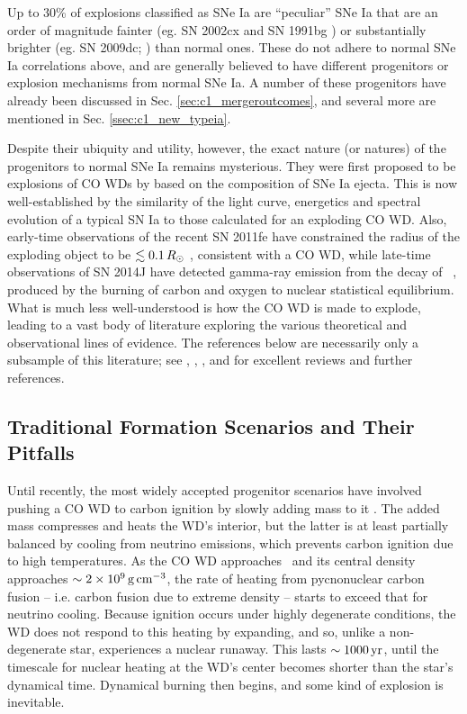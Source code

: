 Up to $30$\% \citep{li+11} of explosions classified as SNe Ia are ``peculiar'' SNe Ia that are an order of magnitude fainter (eg. SN 2002cx \citep{li+02, fole+13} and SN 1991bg \citep{mazz+97}) or substantially brighter (eg. SN 2009dc; \citealt{yama+09, taub+09}) than normal ones.  These do not adhere to normal SNe Ia correlations above, and are generally believed to have different progenitors or explosion mechanisms from normal SNe Ia.  A number of these progenitors have already been discussed in Sec. \ref{sec:c1_mergeroutcomes}, and several more are mentioned in Sec. \ref{ssec:c1_new_typeia}.

Despite their ubiquity and utility, however, the exact nature (or natures) of the progenitors to normal SNe Ia remains mysterious.  They were first proposed to be explosions of CO WDs by \cite{hoylf60} based on the composition of SNe Ia ejecta.  This is now well-established by the similarity of the light curve, energetics and spectral evolution of a typical SN Ia to those calculated for an exploding CO WD.  Also, early-time observations of the recent SN 2011fe have constrained the radius of the exploding object to be $\lesssim0.1\,\Rsun$ \citep{nuge+11, bloo+12,maozmn14}, consistent with a CO WD, while late-time observations of SN 2014J have detected gamma-ray emission from the decay of \Ni\ \citep{chur+14}, produced by the burning of carbon and oxygen to nuclear statistical equilibrium.  What is much less well-understood is how the CO WD is made to explode, leading to a vast body of literature exploring the various theoretical and observational lines of evidence.  The references below are necessarily only a subsample of this literature; see \cite{howe11}, \cite{hill+13}, \cite{maozmn14}, and \cite{tsebs15} for excellent reviews and further references.

\subsection{Traditional Formation Scenarios and Their Pitfalls}
\label{ssec:c1_old_typeia}

Until recently, the most widely accepted progenitor scenarios have involved pushing a CO WD to carbon ignition by slowly adding mass to it \citep{hilln00}.  The added mass compresses and heats the WD's interior, but the latter is at least partially balanced by cooling from neutrino emissions, which prevents carbon ignition due to high temperatures.  As the CO WD approaches \Mch\ and its central density approaches $\sim2\times10^9\,\gcc$, the rate of heating from pycnonuclear carbon fusion -- i.e. carbon fusion due to extreme density -- starts to exceed that for neutrino cooling.  Because ignition occurs under highly degenerate conditions, the WD does not respond to this heating by expanding, and so, unlike a non-degenerate star, experiences a nuclear runaway.  This lasts $\sim1000\,\mathrm{yr}$, until the timescale for nuclear heating at the WD's center becomes shorter than the star's dynamical time.  Dynamical burning then begins, and some kind of explosion is inevitable.

